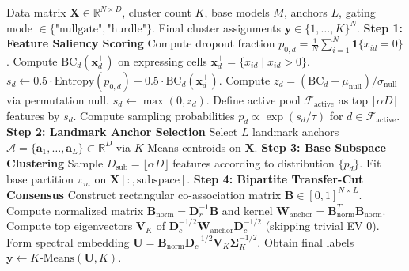 \documentclass[preprint,12pt]{elsarticle}
\begin{document}
\begin{algorithm}[t]
\caption{\textsc{NullConsensus} with Two-Part \textsc{HurdleGate}}\label{alg:nullconsensus}
\begin{algorithmic}[1]
\Require Data matrix $\mathbf{X} \in \mathbb{R}^{N \times D}$, cluster count $K$, base models $M$, anchors $L$, gating mode $\in \{\text{"nullgate"}, \text{"hurdle"}\}$.
\Ensure Final cluster assignments $\mathbf{y} \in \{1, \dots, K\}^N$.
\State \textbf{Step 1: Feature Saliency Scoring}
        \State Compute dropout fraction $p_{0, d} = \frac{1}{N}\sum_{i=1}^N \mathbf{1}\{x_{id} = 0\}$.
        \State Compute $\text{BC}_d(\mathbf{x}_d^+)$ on expressing cells $\mathbf{x}_d^+ = \{x_{id} \mid x_{id} > 0\}$.
        \State $s_d \gets 0.5 \cdot \text{Entropy}(p_{0, d}) + 0.5 \cdot \text{BC}_d(\mathbf{x}_d^+)$.
    \EndFor
\Else
    \State Compute $z_d = (\text{BC}_d - \mu_{\text{null}}) / \sigma_{\text{null}}$ via permutation null.
    \State $s_d \gets \max(0, z_d)$.
\EndIf
\State Define active pool $\mathcal{F}_{\text{active}}$ as top $\lfloor \alpha D \rfloor$ features by $s_d$.
\State Compute sampling probabilities $p_d \propto \exp(s_d / \tau)$ for $d \in \mathcal{F}_{\text{active}}$.
\State \textbf{Step 2: Landmark Anchor Selection}
\State Select $L$ landmark anchors $\mathcal{A} = \{\mathbf{a}_1, \dots, \mathbf{a}_L\} \subset \mathbb{R}^D$ via $K$-Means centroids on $\mathbf{X}$.
\State \textbf{Step 3: Base Subspace Clustering}
    \State Sample $D_{\text{sub}} = \lfloor \alpha D \rfloor$ features according to distribution $\{p_d\}$.
    \State Fit base partition $\pi_m$ on $\mathbf{X}[:, \text{subspace}]$.
\EndFor
\State \textbf{Step 4: Bipartite Transfer-Cut Consensus}
\State Construct rectangular co-association matrix $\mathbf{B} \in [0, 1]^{N \times L}$.
\State Compute normalized matrix $\mathbf{B}_{\text{norm}} = \mathbf{D}_r^{-1} \mathbf{B}$ and kernel $\mathbf{W}_{\text{anchor}} = \mathbf{B}_{\text{norm}}^T \mathbf{B}_{\text{norm}}$.
\State Compute top eigenvectors $\mathbf{V}_K$ of $\mathbf{D}_c^{-1/2} \mathbf{W}_{\text{anchor}} \mathbf{D}_c^{-1/2}$ (skipping trivial EV 0).
\State Form spectral embedding $\mathbf{U} = \mathbf{B}_{\text{norm}} \mathbf{D}_c^{-1/2} \mathbf{V}_K \mathbf{\Sigma}_K^{-1/2}$.
\State Obtain final labels $\mathbf{y} \gets K\text{-Means}(\mathbf{U}, K)$.
\end{algorithmic}
\end{algorithm}
\end{document}
